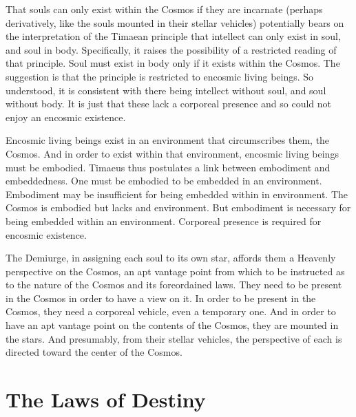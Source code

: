 That souls can only exist within the Cosmos if they are incarnate (perhaps derivatively, like the souls mounted in their stellar vehicles) potentially bears on the interpretation of the Timaean principle that intellect can only exist in soul, and soul in body. Specifically, it raises the possibility of a restricted reading of that principle. Soul must exist in body only if it exists within the Cosmos. The suggestion is that the principle is restricted to encosmic living beings. So understood, it is consistent with there being intellect without soul, and soul without body. It is just that these lack a corporeal presence and so could not enjoy an encosmic existence. 

Encosmic living beings exist in an environment that circumscribes them, the Cosmos. And in order to exist within that environment, encosmic living beings must be embodied. Timaeus thus postulates a link between embodiment and embeddedness. One must be embodied to be embedded in an environment. Embodiment may be insufficient for being embedded within in environment. The Cosmos is embodied but lacks and environment. But embodiment is necessary for being embedded within an environment. Corporeal presence is required for encosmic existence.

The Demiurge, in assigning each soul to its own star, affords them a Heavenly perspective on the Cosmos, an apt vantage point from which to be instructed as to the nature of the Cosmos and its foreordained laws. They need to be present in the Cosmos in order to have a view on it. In order to be present in the Cosmos, they need a corporeal vehicle, even a temporary one. And in order to have an apt vantage point on the contents of the Cosmos, they are mounted in the stars. And presumably, from their stellar vehicles, the perspective of each is directed toward the center of the Cosmos.


\section{The Laws of Destiny} %
\label{sec:the_laws_of_destiny}

